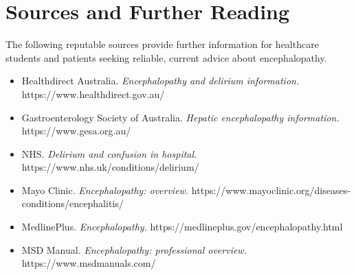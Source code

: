 \section*{Sources and Further Reading}
The following reputable sources provide further information for healthcare students and patients seeking reliable, current advice about encephalopathy.
\begin{itemize}
    \item Healthdirect Australia. \textit{Encephalopathy and delirium information.} https://www.healthdirect.gov.au/
    \item Gastroenterology Society of Australia. \textit{Hepatic encephalopathy information.} https://www.gesa.org.au/
    \item NHS. \textit{Delirium and confusion in hospital.} https://www.nhs.uk/conditions/delirium/
    \item Mayo Clinic. \textit{Encephalopathy: overview.} https://www.mayoclinic.org/diseases-conditions/encephalitis/
    \item MedlinePlus. \textit{Encephalopathy.} https://medlineplus.gov/encephalopathy.html
    \item MSD Manual. \textit{Encephalopathy: professional overview.} https://www.msdmanuals.com/
\end{itemize}
